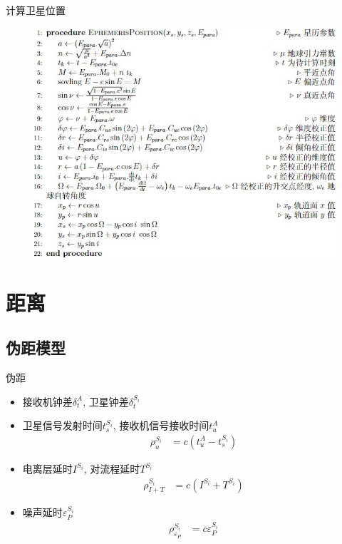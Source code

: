 \begin{frame}{计算卫星位置}
    \begin{figure}
        \centering
        \includegraphics[width = .7\textwidth]{pic/algo_ephemeris.jpg}
        \label{fig:alg_ephemeris}
    \end{figure}
\end{frame}

\section{距离}

\subsection{伪距模型}
\begin{frame}{伪距}
    \begin{itemize}
        \item 接收机钟差$\delta _ t ^ A$, 卫星钟差$\delta _ t ^ { S _ i }$
        \item 卫星信号发射时间$t _ s ^ { S _ i }$, 接收机信号接收时间$t _ u ^ A$
        \begin{align*}
            \rho _ u ^ { S _ i } &= c \left( t _ u ^ A - t _ s ^ { S _ i } \right)
        \end{align*}
        \item 电离层延时$I ^ { S _ i }$, 对流程延时$T ^ { S _ i }$
        \begin{align*}
            \rho _ { I + T } ^ { S _ i } &= c \left( I ^ { S _ i } + T ^ { S _ i } \right)
        \end{align*}
        \item 噪声延时$\varepsilon _ P ^ { S _ i }$
        \begin{align*}
            \rho _ {\varepsilon _ P} ^ { S _ i } &= c \varepsilon _ P ^ { S _ i }
        \end{align*}
    \end{itemize}
\end{frame}

